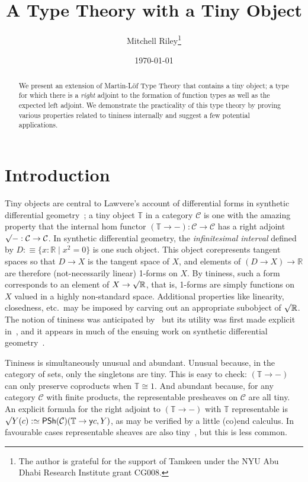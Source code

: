 \documentclass[10pt]{article}
\title{A Type Theory with a Tiny Object}
\author{Mitchell Riley\thanks{The author is grateful for the support of Tamkeen under the
    NYU Abu Dhabi Research Institute grant CG008.}}
\affil{\small New York University Abu Dhabi \\ \href{mailto:mitchell.v.riley@nyu.edu}{mitchell.v.riley@nyu.edu}}
\date{\today}
\theoremstyle{definition}
\let\oldequiv\equiv%
\renewcommand{\equiv}{\simeq}
\newcommand{\defeq}{\oldequiv}
\newcommand*{\RR}{\mathbb{R}}
\newcommand{\Tiny}{\mathbb{T}}
\newcommand{\rformsym}{\surd}
\newcommand{\rformu}[1]{\ThisStyle{\raisebox{0.07em}{$\SavedStyle \rformsym$}} #1}
\newcommand{\PSh}{\mathsf{PSh}}
\newcommand{\yo}{\mathsf{y}}
\newcommand{\C}{\mathcal{C}}
\begin{document}
\maketitle

\begin{abstract}
  We present an extension of Martin-Löf Type Theory that contains a
  tiny object; a type for which there is a \emph{right} adjoint to the
  formation of function types as well as the expected left adjoint.
  We demonstrate the practicality of this type theory by proving
  various properties related to tininess internally and suggest a few
  potential applications.
\end{abstract}

\tableofcontents

\section{Introduction}

Tiny objects are central to Lawvere's account of differential forms in
synthetic differential geometry~\cite{lawvere:towards}; a tiny object $\Tiny$ in a
category $\C$ is one with the amazing property that the internal hom
functor ${(\Tiny \to -) : \C \to \C}$ has a right adjoint
${\rformu - : \C \to \C}$. In synthetic differential geometry, the
\emph{infinitesimal interval} defined by
${D :\defeq \{ x : \mathbb{R} \mid x^2 = 0 \}}$ is one such object. This
object corepresents tangent spaces so that $D \to X$ is the tangent
space of $X$, and elements of $(D \to X) \to \RR$ are therefore
(not-necessarily linear) 1-forms on $X$. By tininess, such a form
corresponds to an element of $X \to \rformu \RR$, that is, 1-forms are
simply functions on $X$ valued in a highly non-standard space.
Additional properties like linearity, closedness, etc.\ may be imposed
by carving out an appropriate subobject of $\rformu \RR$. The notion
of tininess was anticipated by~\cite{kock-reyes:manifolds,
  lawvere:categorical-dynamics} but its utility was first made
explicit in~\cite[\S 3]{lawvere:towards}, and it appears in much of
the ensuing work on synthetic differential
geometry~\cite{lawvere:laws-of-motion, lawvere:outline-sdg,
  lawvere:microphysics, lawvere:adjoints, lawvere:euler-vindicated,
  kock-reyes:differential-equations, kock-reyes:fractional, kock:sdg}.

Tininess is simultaneously unusual and abundant. Unusual because, in
the category of sets, only the singletons are tiny. This is easy to
check: $(\Tiny \to -)$ can only preserve coproducts when $\Tiny \cong 1$.
And abundant because, for any category $\C$ with finite products, the
representable presheaves on $\C$ are all tiny. An explicit formula for
the right adjoint to $(\Tiny \to -)$ with $\Tiny$ representable is
$\rformu{Y}(c) :\defeq \PSh(\C)(\Tiny \to \yo c, Y)$, as may be
verified by a little (co)end calculus. In favourable cases
representable sheaves are also tiny~\cite[Appendix
4]{moerdijk-reyes:book}, but this is less common.
\end{document}
